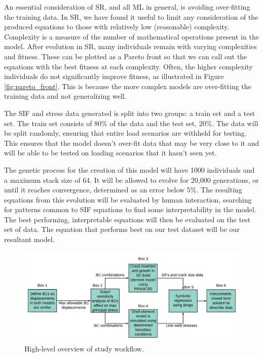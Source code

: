 An essential consideration of SR, and all ML in general, is avoiding over-fitting
the training data. In SR, we have found it useful to limit any consideration of
the produced equations to those with relatively low (reasonable) complexity.
Complexity is a measure of the number of mathematical operations present in the
model. After evolution in SR, many individuals remain with varying complexities
and fitness. These can be plotted as a Pareto front so that we can call out the
equations with the best fitness at each complexity.  Often, the higher
complexity individuals do not significantly improve fitness, as illustrated in
Figure \ref{fig:pareto_front}. This is because the more complex models are over-fitting the training data and not generalizing well. 

The SIF and stress data generated is split into two groups: a train set and
a test set. The train set consists of 80\% of the data and the test set, 20\%.
The data will be split randomly, ensuring that entire load scenarios are
withheld for testing. This ensures that the model doesn't over-fit data that may
be very close to it and will be able to be tested on loading scenarios that it
hasn't seen yet. 

The genetic process for the creation of this model will have 1000 individuals
and a maximum stack size of 64. It will be allowed to evolve for 20,000
generations, or until it reaches convergence, determined as an error below 5\%.
The resulting equations from this evolution will be evaluated by human
interaction, searching for patterns common to SIF equations to find some
interpretability in the model.  The best performing, interpretable equations
will then be evaluated on the test set of data. The equation that performs best
on our test dataset will be our resultant model. 

\begin{figure}
\centering
\includegraphics[width=\textwidth,height=\textheight,keepaspectratio]{workflow.png}
\caption{High-level overview of study workflow.}
\label{fig:workflow}
\end{figure}

